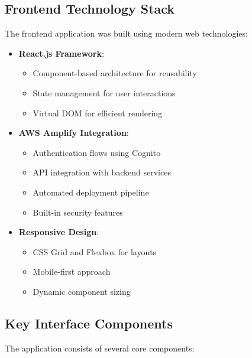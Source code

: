 \documentclass[12pt]{article}
\begin{document}
\subsection{Frontend Technology Stack}
The frontend application was built using modern web technologies:
\begin{itemize}
    \item \textbf{React.js Framework}:
    \begin{itemize}
        \item Component-based architecture for reusability
        \item State management for user interactions
        \item Virtual DOM for efficient rendering
    \end{itemize}
    
    \item \textbf{AWS Amplify Integration}:
    \begin{itemize}
        \item Authentication flows using Cognito
        \item API integration with backend services
        \item Automated deployment pipeline
        \item Built-in security features
    \end{itemize}
    
    \item \textbf{Responsive Design}:
    \begin{itemize}
        \item CSS Grid and Flexbox for layouts
        \item Mobile-first approach
        \item Dynamic component sizing
    \end{itemize}
\end{itemize}

\subsection{Key Interface Components}
The application consists of several core components:
\end{document}
